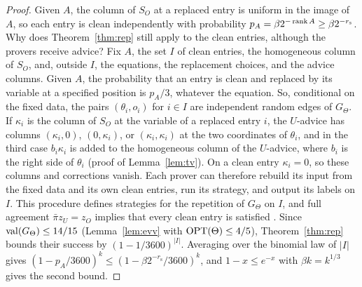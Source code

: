 \begin{proof}
Given $A$, the column of $S_O$ at a replaced entry is uniform in the image of $A$, so each entry is clean independently with probability $p_A=\beta2^{-\operatorname{rank} A}\ge\beta2^{-r_{\mathrm s}}$. Why does Theorem~\ref{thm:rep} still apply to the clean entries, although the provers receive advice? Fix $A$, the set $I$ of clean entries, the homogeneous column of $S_O$, and, outside $I$, the equations, the replacement choices, and the advice columns. Given $A$, the probability that an entry is clean and replaced by its variable at a specified position is $p_A/3$, whatever the equation. So, conditional on the fixed data, the pairs $(\theta_i,o_i)$ for $i\in I$ are independent random edges of $G_\Theta$. If $\kappa_i$ is the column of $S_O$ at the variable of a replaced entry $i$, the $U$-advice has columns $(\kappa_i,0)$, $(0,\kappa_i)$, or $(\kappa_i,\kappa_i)$ at the two coordinates of $\theta_i$, and in the third case $b_i\kappa_i$ is added to the homogeneous column of the $U$-advice, where $b_i$ is the right side of $\theta_i$ (proof of Lemma~\ref{lem:tv}). On a clean entry $\kappa_i=0$, so these columns and corrections vanish. Each prover can therefore rebuild its input from the fixed data and its own clean entries, run its strategy, and output its labels on $I$. This procedure defines strategies for the repetition of $G_\Theta$ on $I$, and full agreement $\bar\pi z_U=z_O$ implies that every clean entry is satisfied \cite[proof of Lemma~6.2]{OAI}. Since $\operatorname{val}(G_\Theta)\le14/15$ (Lemma~\ref{lem:evv} with $\operatorname{OPT}(\Theta)\le4/5$), Theorem~\ref{thm:rep} bounds their success by $(1-1/3600)^{|I|}$. Averaging over the binomial law of $|I|$ gives $(1-p_A/3600)^k\le(1-\beta2^{-r_{\mathrm s}}/3600)^k$, and $1-x\le e^{-x}$ with $\beta k=k^{1/3}$ gives the second bound.
\end{proof}

